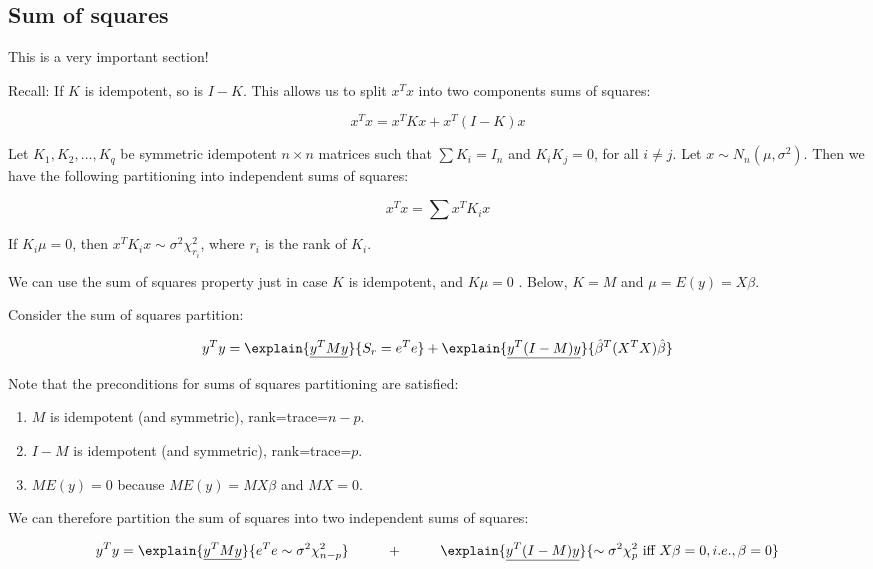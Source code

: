 \subsection{Sum of squares}

This is a very important section!

\begin{fmpage}{\linewidth}

Recall:
If $K$ is idempotent, so is $I-K$. This allows us to split $x^T x$ into two components sums of squares:

\begin{equation}
x^T x = x^T K x+x^T (I-K) x
\end{equation}

 Let $K_1, K_2,\dots, K_q$ be symmetric idempotent $n \times n$ matrices such that
 $\sum K_i= I_n$ and $K_iK_j =0$, for all $i\neq j $. Let $x\sim N_n(\mu, \sigma^2)$.
 Then we have the following partitioning into independent sums of squares:
 
  \begin{equation}
x^T x = \sum x^T K_i x
\end{equation}

If $K_i \mu = 0$, then $ x^T K_i x\sim \sigma^2 \chi_{r_i}^2$, where $r_i$ is the rank of $K_i$.
\end{fmpage}

We can use the sum of squares property just in case $K$ is idempotent, and $K\mu =0$ . Below, $K=M$ and $\mu=E(y)=X\beta$.

Consider the sum of squares partition:

\begin{equation}
y^T y = \explain{\underline{y^T M y}}{S_r= e^T e} + \explain{\underline{y^T (I-M) y}}{\hat{\beta}^T (X^T X)\hat{\beta}}
\end{equation}

Note that the preconditions for sums of squares partitioning are satisfied:
\begin{enumerate}
\item $M$ is idempotent  (and symmetric), rank=trace=$n-p$.
\item $I-M$ is idempotent (and symmetric), rank=trace=$p$.
\item $ME(y) = 0$ because $ME(y)=MX\beta$ and $MX=0$.
\end{enumerate}

We can therefore partition the sum of squares into two independent sums of squares:

\begin{equation}
y^T y = \explain{\underline{y^T M y}}{e^T e \sim \sigma^2 \chi_{n-p}^2} \hbox{~~~~~~~~}+\hbox{~~~~~~~~} 
\explain{\underline{y^T (I-M) y}}{ \sim \sigma^2 \chi_p^2 \newline \hbox{ iff } X\beta=0, i.e., \beta=0}
\end{equation}

